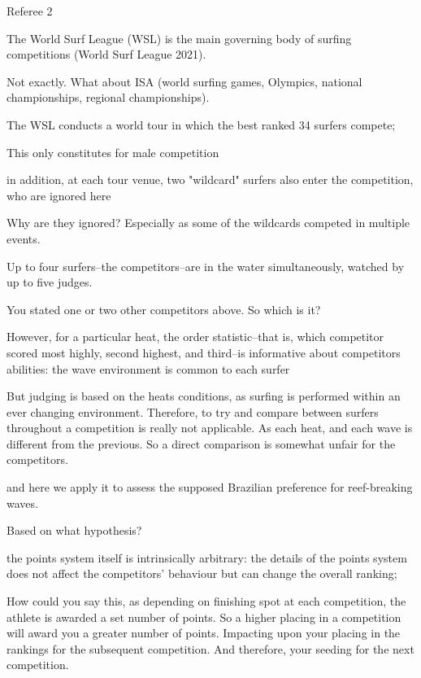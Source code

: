 Referee 2


The World Surf League (WSL) is the main governing
body of surfing competitions (World Surf League 2021).

Not exactly. What about ISA (world surfing games, Olympics, national
championships, regional championships).


The WSL conducts a
world tour in which the best ranked 34 surfers compete;

This only constitutes for male competition


in addition, at each tour venue, two "wildcard" surfers also enter the
competition, who are ignored here

Why are they ignored? Especially as some of the wildcards competed in multiple events.


Up to four surfers--the competitors--are in the water simultaneously,
watched by up to five judges.

You stated one or two other competitors above. So which is it?

However, for a particular heat, the order statistic--that is, which
competitor scored most highly, second highest, and third--is
informative about competitors abilities: the wave environment is
common to each surfer

But judging is based on the heats conditions, as surfing is performed
within an ever changing environment. Therefore, to try and compare
between surfers throughout a competition is really not applicable. As
each heat, and each wave is different from the previous. So a direct
comparison is somewhat unfair for the competitors.



and here we apply it to assess the supposed Brazilian preference for
reef-breaking waves.

Based on what hypothesis?


the points system itself is intrinsically arbitrary: the details of
the points system does not affect the competitors' behaviour but can
change the overall ranking;

How could you say this, as depending on finishing spot at each
competition, the athlete is awarded a set number of points. So a
higher placing in a competition will award you a greater number of
points. Impacting upon your placing in the rankings for the subsequent
competition. And therefore, your seeding for the next competition.
